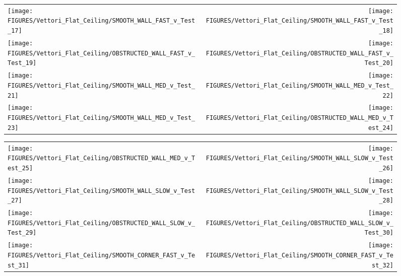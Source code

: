 \begin{figure}[p]
\begin{tabular*}{\textwidth}{l@{\extracolsep{\fill}}r}
\texttt{[image: FIGURES/Vettori\_Flat\_Ceiling/SMOOTH\_WALL\_FAST\_v\_Test\_17]} &
\texttt{[image: FIGURES/Vettori\_Flat\_Ceiling/SMOOTH\_WALL\_FAST\_v\_Test\_18]} \\
\texttt{[image: FIGURES/Vettori\_Flat\_Ceiling/OBSTRUCTED\_WALL\_FAST\_v\_Test\_19]} &
\texttt{[image: FIGURES/Vettori\_Flat\_Ceiling/OBSTRUCTED\_WALL\_FAST\_v\_Test\_20]} \\
\texttt{[image: FIGURES/Vettori\_Flat\_Ceiling/SMOOTH\_WALL\_MED\_v\_Test\_21]} &
\texttt{[image: FIGURES/Vettori\_Flat\_Ceiling/SMOOTH\_WALL\_MED\_v\_Test\_22]} \\
\texttt{[image: FIGURES/Vettori\_Flat\_Ceiling/SMOOTH\_WALL\_MED\_v\_Test\_23]} &
\texttt{[image: FIGURES/Vettori\_Flat\_Ceiling/OBSTRUCTED\_WALL\_MED\_v\_Test\_24]} \\
\end{tabular*}
\label{Vettori_3}
\end{figure}

\begin{figure}[p]
\begin{tabular*}{\textwidth}{l@{\extracolsep{\fill}}r}
\texttt{[image: FIGURES/Vettori\_Flat\_Ceiling/OBSTRUCTED\_WALL\_MED\_v\_Test\_25]} &
\texttt{[image: FIGURES/Vettori\_Flat\_Ceiling/SMOOTH\_WALL\_SLOW\_v\_Test\_26]} \\
\texttt{[image: FIGURES/Vettori\_Flat\_Ceiling/SMOOTH\_WALL\_SLOW\_v\_Test\_27]} &
\texttt{[image: FIGURES/Vettori\_Flat\_Ceiling/SMOOTH\_WALL\_SLOW\_v\_Test\_28]} \\
\texttt{[image: FIGURES/Vettori\_Flat\_Ceiling/OBSTRUCTED\_WALL\_SLOW\_v\_Test\_29]} &
\texttt{[image: FIGURES/Vettori\_Flat\_Ceiling/OBSTRUCTED\_WALL\_SLOW\_v\_Test\_30]} \\
\texttt{[image: FIGURES/Vettori\_Flat\_Ceiling/SMOOTH\_CORNER\_FAST\_v\_Test\_31]} &
\texttt{[image: FIGURES/Vettori\_Flat\_Ceiling/SMOOTH\_CORNER\_FAST\_v\_Test\_32]} \\
\end{tabular*}
\label{Vettori_4}
\end{figure}

